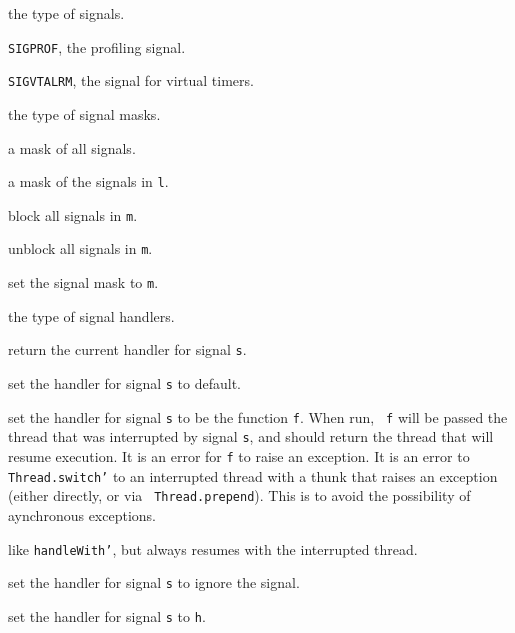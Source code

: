 \begin{description}

 the type of signals.

{\tt SIGPROF}, the profiling signal.

{\tt SIGVTALRM}, the signal for virtual timers.

 the type of signal masks.

 a mask of all signals.

 a mask of the signals in {\tt l}.

 block all signals in {\tt m}.

 unblock all signals in {\tt m}.

 set the signal mask to {\tt m}.

 the type of signal handlers.

 return the current handler for signal {\tt s}.

 set the handler for signal {\tt s} to default.

set the handler for signal {\tt s} to be the function {\tt f}.  When run, {\tt
f} will be passed the thread that was interrupted by signal {\tt s}, and should
return the thread that will resume execution.  It is an error for {\tt f} to
raise an exception.  It is an error to {\tt Thread.switch'} to an interrupted
thread with a thunk that raises an exception (either directly, or via {\tt
Thread.prepend}).  This is to avoid the possibility of aynchronous exceptions.

 like {\tt handleWith'}, but always resumes with the
interrupted thread.

 set the handler for signal {\tt s} to ignore the signal.

 set the handler for signal {\tt s} to {\tt h}.
\end{description}

